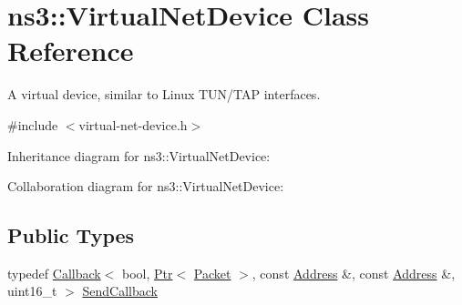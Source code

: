 \hypertarget{classns3_1_1VirtualNetDevice}{}\section{ns3\+:\+:Virtual\+Net\+Device Class Reference}
\label{classns3_1_1VirtualNetDevice}


A virtual device, similar to Linux T\+U\+N/\+T\+AP interfaces.  




{\ttfamily \#include $<$virtual-\/net-\/device.\+h$>$}



Inheritance diagram for ns3\+:\+:Virtual\+Net\+Device\+:


Collaboration diagram for ns3\+:\+:Virtual\+Net\+Device\+:
\subsection*{Public Types}
\begin{DoxyCompactItemize}
\item 
typedef \hyperlink{classns3_1_1Callback}{Callback}$<$ bool, \hyperlink{classns3_1_1Ptr}{Ptr}$<$ \hyperlink{classns3_1_1Packet}{Packet} $>$, const \hyperlink{classns3_1_1Address}{Address} \&, const \hyperlink{classns3_1_1Address}{Address} \&, uint16\+\_\+t $>$ \hyperlink{classns3_1_1VirtualNetDevice_aebf725ef61f43759033989504a83dd7f}{Send\+Callback}
\end{DoxyCompactItemize}
